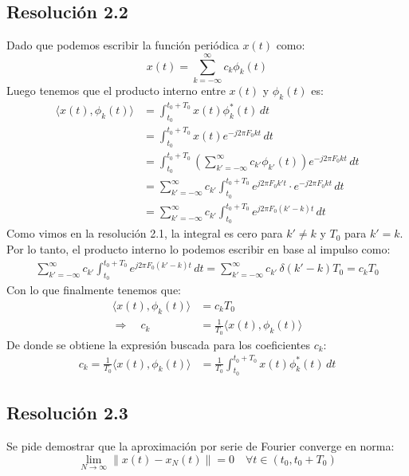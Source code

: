 \documentclass[
  11pt,
  letterpaper,
   addpoints,
   answers
  ]{exam}
\begin{document}
\begin{questions}
\begin{solution}
\subsection*{Resolución 2.2}
Dado que podemos escribir la función periódica \(x(t)\) como:
\begin{equation}
x(t) = \sum_{k=-\infty}^{\infty} c_k \phi_{k}(t)
\end{equation}
Luego tenemos que el producto interno entre \(x(t)\) y \(\phi_k(t)\) es:
\begin{align}
\langle x(t), \phi_k(t) \rangle &= \int_{t_0}^{t_0+T_0} x(t) \phi_k^{*}(t) \, dt \\
&= \int_{t_0}^{t_0+T_0} x(t) e^{-j 2\pi F_{0} k t} \, dt \\
&= \int_{t_0}^{t_0+T_0} \left( \sum_{k'=-\infty}^{\infty} c_{k'} \phi_{k'}(t) \right) e^{-j 2\pi F_{0} k t} \, dt \\
&= \sum_{k'=-\infty}^{\infty} c_{k'} \int_{t_0}^{t_0+T_0} e^{j 2\pi F_{0} k' t} \cdot e^{-j 2\pi F_{0} k t} \, dt\\
&= \sum_{k'=-\infty}^{\infty} c_{k'} \int_{t_0}^{t_0+T_0} e^{j 2\pi F_{0} (k' - k) t} \, dt
\end{align}
Como vimos en la resolución 2.1, la integral es cero para \(k' \neq k\) y \(T_0\) para \(k' = k\). Por lo tanto, el producto interno lo podemos escribir en base al impulso como:
\begin{align}
  \sum_{k'=-\infty}^{\infty} c_{k'} \int_{t_0}^{t_0+T_0} e^{j 2\pi F_{0} (k' - k) t} \, dt = \sum_{k'=-\infty}^{\infty} c_{k'} \, \delta(k'-k) T_{0} = c_{k} T_0
\end{align}
Con lo que finalmente tenemos que:
\begin{align}
  \langle x(t), \phi_k(t) \rangle &= c_k T_0 \\
  \Rightarrow \quad c_k &= \frac{1}{T_0} \langle x(t), \phi_k(t) \rangle
\end{align}
De donde se obtiene la expresión buscada para los coeficientes \(c_k\):
\begin{align}
  c_{k} = \frac{1}{T_0} \langle x(t), \phi_k(t) \rangle &= \frac{1}{T_0} \int_{t_0}^{t_0+T_0} x(t) \phi_k^{*}(t) \, dt
\end{align}
\subsection*{Resolución 2.3}
Se pide demostrar que la aproximación por serie de Fourier converge en norma:
\begin{equation}
\lim_{N \to \infty} \| x(t) - x_N(t) \| = 0 \quad \forall t \in (t_0 , t_0+T_0)
\end{equation}


\end{solution}
\end{questions}
\end{document}
